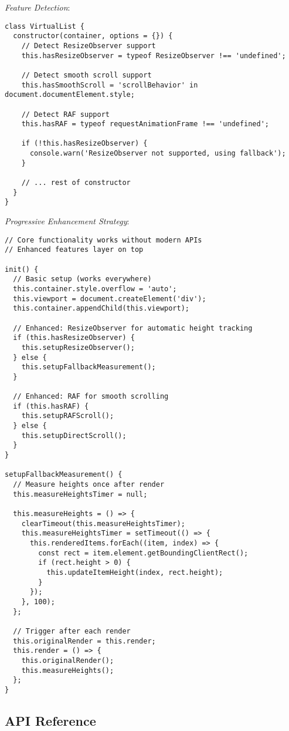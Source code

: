 \documentclass[11pt]{article}
\begin{document}
\emph{Feature Detection}:

\begin{verbatim}
class VirtualList {
  constructor(container, options = {}) {
    // Detect ResizeObserver support
    this.hasResizeObserver = typeof ResizeObserver !== 'undefined';
    
    // Detect smooth scroll support
    this.hasSmoothScroll = 'scrollBehavior' in document.documentElement.style;
    
    // Detect RAF support
    this.hasRAF = typeof requestAnimationFrame !== 'undefined';
    
    if (!this.hasResizeObserver) {
      console.warn('ResizeObserver not supported, using fallback');
    }
    
    // ... rest of constructor
  }
}
\end{verbatim}

\emph{Progressive Enhancement Strategy}:

\begin{verbatim}
// Core functionality works without modern APIs
// Enhanced features layer on top

init() {
  // Basic setup (works everywhere)
  this.container.style.overflow = 'auto';
  this.viewport = document.createElement('div');
  this.container.appendChild(this.viewport);
  
  // Enhanced: ResizeObserver for automatic height tracking
  if (this.hasResizeObserver) {
    this.setupResizeObserver();
  } else {
    this.setupFallbackMeasurement();
  }
  
  // Enhanced: RAF for smooth scrolling
  if (this.hasRAF) {
    this.setupRAFScroll();
  } else {
    this.setupDirectScroll();
  }
}

setupFallbackMeasurement() {
  // Measure heights once after render
  this.measureHeightsTimer = null;
  
  this.measureHeights = () => {
    clearTimeout(this.measureHeightsTimer);
    this.measureHeightsTimer = setTimeout(() => {
      this.renderedItems.forEach((item, index) => {
        const rect = item.element.getBoundingClientRect();
        if (rect.height > 0) {
          this.updateItemHeight(index, rect.height);
        }
      });
    }, 100);
  };
  
  // Trigger after each render
  this.originalRender = this.render;
  this.render = () => {
    this.originalRender();
    this.measureHeights();
  };
}
\end{verbatim}
\subsection{API Reference}
\label{sec:org3f37e75}
\end{document}
